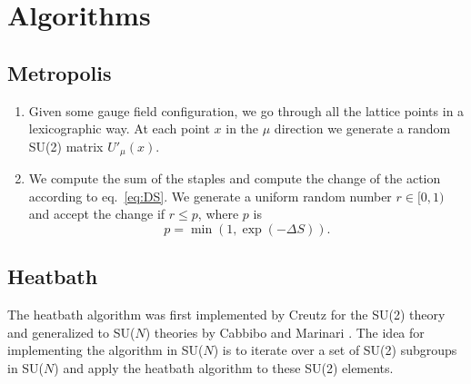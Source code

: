 \documentclass[12pt,a4paper]{article}
\begin{document}
\section{Algorithms}

\subsection{Metropolis}
\begin{enumerate}
	\item Given some gauge field configuration, we go through all the lattice points in a lexicographic way. At each point $x$ in the $\mu$ direction we generate a random SU(2) matrix $U'_{\mu}(x)$.
	
	\item We compute the sum of the staples and compute the change of the action according to eq.\ \eqref{eq:DS}. We generate a uniform random number $r\in [0,1)$ and accept the change if $r \leq p$, where $p$ is
	\begin{equation}
		p = \min (1, \exp(-\Delta S)).
\end{equation}	 
\end{enumerate}

\subsection{Heatbath}
The heatbath algorithm was first implemented by Creutz for the SU(2) theory \cite{creutz1980} and generalized to SU($N$) theories by Cabbibo and Marinari \cite{cabbibo1982}. The idea for implementing the algorithm in SU($N$) is to iterate over a set of SU(2) subgroups in SU($N$) and apply the heatbath algorithm to these SU(2) elements. 
\end{document}
